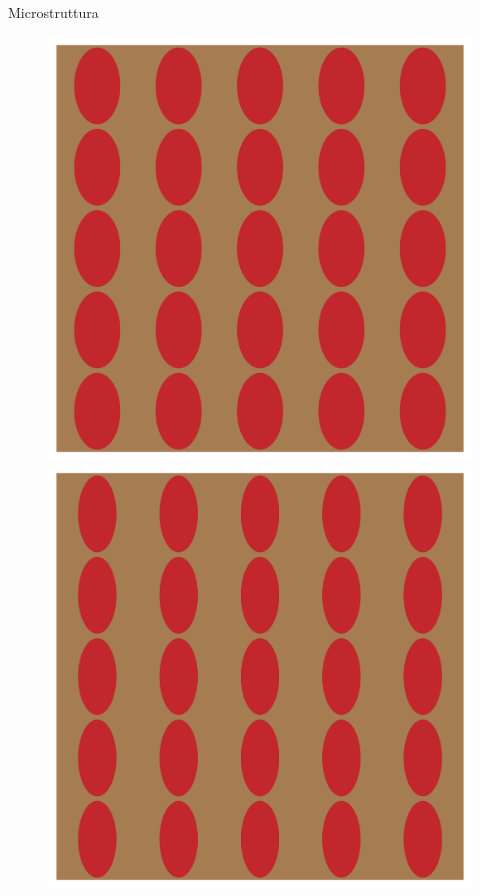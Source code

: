 \documentclass[aspectratio=169,xcolor=dvipsnames]{beamer}
\begin{document}
\begin{frame}{Microstruttura}
\begin{figure}
\begin{minipage}[b]{0.16\linewidth}
		\includegraphics[width=\linewidth]{test_mesh_axR_0.6.png}
	\end{minipage} 
	\begin{minipage}[b]{0.16\linewidth}
		\includegraphics[width=\linewidth]{test_mesh_axR_0.5.png}

\end{minipage}
\end{figure}
\end{frame}
\end{document}
